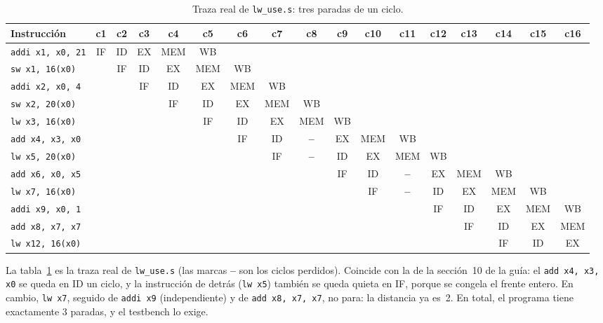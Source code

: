 \documentclass[11pt,letterpaper]{article}
\newcommand{\cod}[1]{\texttt{#1}}
\begin{document}
\begin{table}[!htbp]
\centering\scriptsize
\setlength{\tabcolsep}{2.2pt}
\begin{tabular}{@{}lcccccccccccccccc@{}}
\toprule
\textbf{Instrucci\'on} & \textbf{c1} & \textbf{c2} & \textbf{c3} & \textbf{c4} & \textbf{c5} & \textbf{c6} & \textbf{c7} & \textbf{c8} & \textbf{c9} & \textbf{c10} & \textbf{c11} & \textbf{c12} & \textbf{c13} & \textbf{c14} & \textbf{c15} & \textbf{c16} \\
\midrule
\texttt{addi x1, x0, 21} & IF & ID & EX & MEM & WB &  &  &  &  &  &  &  &  &  &  &  \\
\texttt{sw x1, 16(x0)} &  & IF & ID & EX & MEM & WB &  &  &  &  &  &  &  &  &  &  \\
\texttt{addi x2, x0, 4} &  &  & IF & ID & EX & MEM & WB &  &  &  &  &  &  &  &  &  \\
\texttt{sw x2, 20(x0)} &  &  &  & IF & ID & EX & MEM & WB &  &  &  &  &  &  &  &  \\
\texttt{lw x3, 16(x0)} &  &  &  &  & IF & ID & EX & MEM & WB &  &  &  &  &  &  &  \\
\texttt{add x4, x3, x0} &  &  &  &  &  & IF & ID & \textcolor{control}{\textbf{--}} & EX & MEM & WB &  &  &  &  &  \\
\texttt{lw x5, 20(x0)} &  &  &  &  &  &  & IF & \textcolor{control}{\textbf{--}} & ID & EX & MEM & WB &  &  &  &  \\
\texttt{add x6, x0, x5} &  &  &  &  &  &  &  &  & IF & ID & \textcolor{control}{\textbf{--}} & EX & MEM & WB &  &  \\
\texttt{lw x7, 16(x0)} &  &  &  &  &  &  &  &  &  & IF & \textcolor{control}{\textbf{--}} & ID & EX & MEM & WB &  \\
\texttt{addi x9, x0, 1} &  &  &  &  &  &  &  &  &  &  &  & IF & ID & EX & MEM & WB \\
\texttt{add x8, x7, x7} &  &  &  &  &  &  &  &  &  &  &  &  & IF & ID & EX & MEM \\
\texttt{lw x12, 16(x0)} &  &  &  &  &  &  &  &  &  &  &  &  &  & IF & ID & EX \\
\bottomrule
\end{tabular}
\caption{Traza real de \cod{lw\_use.s}: tres paradas de un ciclo.}
\label{tab:traza_lw}
\end{table}

La tabla~\ref{tab:traza_lw} es la traza real de \cod{lw\_use.s} (las marcas \textcolor{control}{\textbf{--}}
son los ciclos perdidos). Coincide con la de la secci\'on~10 de la gu\'ia: el \cod{add x4, x3, x0}
se queda en ID un ciclo, y la instrucci\'on de detr\'as (\cod{lw x5}) tambi\'en se queda quieta en IF,
porque se congela el frente entero. En cambio, \cod{lw x7}, seguido de \cod{addi x9} (independiente)
y de \cod{add x8, x7, x7}, no para: la distancia ya es~2. En total, el programa tiene exactamente 3
paradas, y el testbench lo exige.
\end{document}
